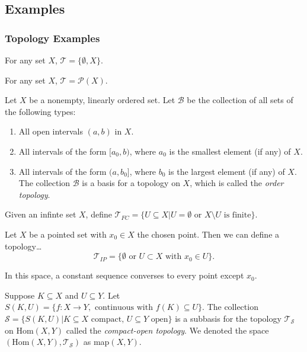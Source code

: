 \subsection{Examples}

\subsubsection{Topology Examples}\label{exampletopologies}

\label{indiscretetopology}

For any set $X$, $\mathcal{T} = \{\emptyset, X\}$.

\label{discretetopology}

For any set $X$, $\mathcal{T} = \mathcal{P}(X)$.

\label{ordertopology}
Let $X$ be a nonempty, linearly ordered set. Let $\mathcal{B}$ be the collection of all sets of the following types:
\begin{enumerate}
\item All open intervals $(a,b)$ in $X$.
\item All intervals of the form $[a_0,b)$, where $a_0$ is the smallest element (if any) of $X$.
\item All intervals of the form $(a,b_0]$, where $b_0$ is the largest element (if any) of $X$.
The collection $\mathcal{B}$ is a basis for a topology on $X$, which is called the \emph{order topology}.
\end{enumerate}

\label{finitecomplementtopology}

Given an infinte set $X$, define $\mathcal{T}_{FC} = \{U \subseteq X | U = \emptyset \textrm{ or } X \setminus U \textrm{ is finite}\}$.

\label{includedpointtopology}
Let $X$ be a pointed set with $x_0 \in X$ the chosen point. Then we can define a topology\dots
$$\mathcal{T}_{IP} = \{ \emptyset \textrm{ or } U \subset X \textrm{ with } x_0 \in U \}.$$

\noindent In this space, a constant sequence converses to every point except $x_0$.

\label{compactopentopology}
Suppose $K \subseteq X$ and $U \subseteq Y$. Let $S(K,U) = \{f : X \rightarrow Y, \textrm{ continuous with } f(K) \subseteq U \}$. The collection
$\mathcal{S} = \{ S(K,U) | K \subseteq X \textrm{ compact, } U \subseteq Y \textrm{ open} \}$ is a subbasis for the topology $\mathcal{T}_{\mathcal{S}}$
on Hom$(X,Y)$ called the \emph{compact-open topology}. We denoted the space $(\textrm{Hom}(X,Y),\mathcal{T}_{\mathcal{S}})$ as map$(X,Y)$.

